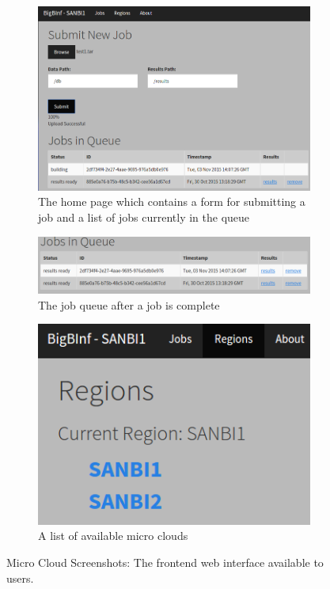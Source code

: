 \documentclass{sig-alternate-05-2015}
\begin{document}
\begin{figure}[t!]
\centering
	\begin{subfigure}[h]{.9\textwidth}
		\includegraphics[width=\textwidth]{img/screenshot2.png}
		\caption{The home page which contains a form for submitting a job and a list of jobs currently in the queue}
		\label{fig:screenshot2}
	\end{subfigure}
	\begin{subfigure}[h]{.9\textwidth}
		\includegraphics[width=\textwidth]{img/screenshotjobqueue2.png}
		\caption{The job queue after a job is complete}
		\label{fig:screenshotjobqueue}
	\end{subfigure}
	\begin{subfigure}[h]{.5\textwidth}
		\includegraphics[width=\textwidth]{img/screenshotRegions.png}
		\caption{A list of available micro clouds}
		\label{fig:screenshotRegions}
	\end{subfigure}
\caption{Micro Cloud Screenshots: The frontend web interface available to users. }
\label{fig:screenshots}
\end{figure}
\end{document}
